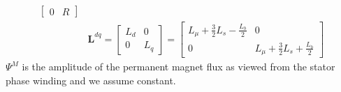 \documentclass[12pt,a4paper,oneside]{book}
\begin{document}
\begin{onehalfspace}
\begin{mybox}
\begin{equation*}
\begin{aligned}
\begin{bmatrix}
				0 & R
			\end{bmatrix} \\[6pt]
			& \mathbf{L}^{dq} = 
			\begin{bmatrix} L_d &  0 \\
				0 & L_q
			\end{bmatrix} =
			\begin{bmatrix} L_\mu+\frac{3}{2}L_s-\frac{L_b}{2} &  0 \\
				0 & L_\mu+\frac{3}{2}L_s+\frac{L_b}{2}
			\end{bmatrix}
		\end{aligned} 
	\end{equation*}
	$\Psi^M$ is the amplitude of the permanent magnet flux as viewed from 
	the stator phase winding and we assume constant.
\end{mybox}


\end{onehalfspace}
\end{document}

